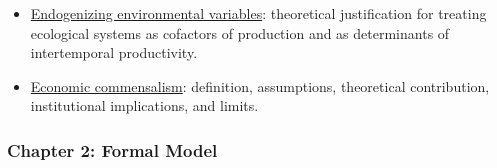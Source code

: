 \begin{itemize}
\begin{itemize}
        \item[iv.] \underline{Endogenizing environmental variables}: theoretical justification for treating ecological systems as cofactors of production and as determinants of intertemporal productivity.

        \item[v.] \underline{Economic commensalism}: definition, assumptions, theoretical contribution, institutional implications, and limits.

    \end{itemize}

\end{itemize}

\subsubsection{Chapter 2: Formal Model}

